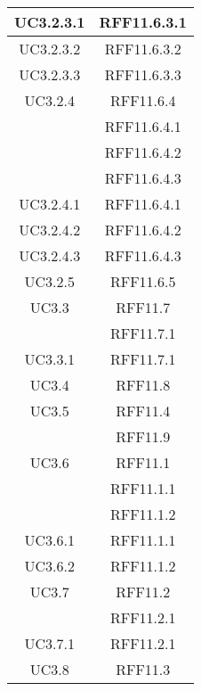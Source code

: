 \begin{longtable}{|c|c|}
\midrule
UC3.2.3.1
& RFF11.6.3.1\\

\midrule
UC3.2.3.2
& RFF11.6.3.2\\

\midrule
UC3.2.3.3
& RFF11.6.3.3\\

\midrule
UC3.2.4
& RFF11.6.4\\
& RFF11.6.4.1\\
& RFF11.6.4.2\\
& RFF11.6.4.3\\

\midrule
UC3.2.4.1
& RFF11.6.4.1\\

\midrule
UC3.2.4.2
& RFF11.6.4.2\\

\midrule
UC3.2.4.3
& RFF11.6.4.3\\

\midrule
UC3.2.5
& RFF11.6.5\\

\midrule
UC3.3
& RFF11.7\\
& RFF11.7.1\\

\midrule
UC3.3.1
& RFF11.7.1\\

\midrule
UC3.4
& RFF11.8\\

\midrule
UC3.5
& RFF11.4\\
& RFF11.9\\

\midrule
UC3.6
& RFF11.1\\
& RFF11.1.1\\
& RFF11.1.2\\

\midrule
UC3.6.1
& RFF11.1.1\\

\midrule
UC3.6.2
& RFF11.1.2\\

\midrule
UC3.7
& RFF11.2\\
& RFF11.2.1\\

\midrule
UC3.7.1
& RFF11.2.1\\

\midrule
UC3.8
& RFF11.3\\

\end{longtable}
